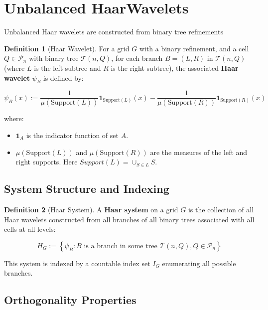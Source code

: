 \documentclass[12pt,a4paper]{article}
\theoremstyle{definition}
\newtheorem{definition}{Definition}[section]
\newcommand{\myset}[1]{\left\{#1\right\}}
\begin{document}
 
\newpage

\section{Unbalanced HaarWavelets}


Unbalanced Haar   wavelets are constructed from binary tree refinements

\begin{definition}[Haar Wavelet]
For a grid $G$ with a binary refinement, and a cell $Q \in \mathcal{P}_n$ with binary tree $\mathcal{T}(n, Q)$, for each branch $B = (L, R)$ in $\mathcal{T}(n, Q)$ (where $L$ is the left subtree and $R$ is the right subtree), the associated \textbf{Haar wavelet} $\psi_B$ is defined by:

$$\psi_B(x) := \frac{1}{\mu(\text{Support}(L))} \mathbf{1}_{\text{Support}(L)}(x) - \frac{1}{\mu(\text{Support}(R))} \mathbf{1}_{\text{Support}(R)}(x)$$

where:
\begin{itemize}
  \item $\mathbf{1}_{A}$ is the indicator function of set $A$.
  \item $\mu(\text{Support}(L))$ and $\mu(\text{Support}(R))$ are the measures of the left and right supports. Here $Support (L)= \cup_{S\in L} S$. 
\end{itemize}
\end{definition}

 

\subsection{System Structure and Indexing}

\begin{definition}[Haar System]
A \textbf{Haar system} on a grid $G$ is the collection of all Haar wavelets constructed from all branches of all binary trees associated with all cells at all levels:

$$H_G := \myset{\psi_B : \text{$B$ is a branch in some tree } \mathcal{T}(n, Q), Q \in \mathcal{P}_n}$$

This system is indexed by a countable index set $I_G$ enumerating all possible branches.
\end{definition}

 

\subsection{Orthogonality Properties}
\end{document}

